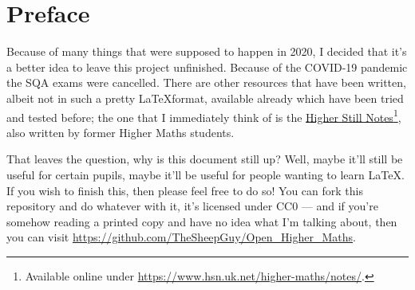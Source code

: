 \chapter{Preface}
Because of many things that were supposed to happen in 2020, I decided that it's a better idea to leave this project unfinished. Because of the COVID-19 pandemic the SQA exams were cancelled. There are other resources that have been written, albeit not in such a pretty \LaTeX format, available already which have been tried and tested before; the one that I immediately think of is the \href{https://www.hsn.uk.net/higher-maths/notes/}{Higher Still Notes}\footnote{Available online under \url{https://www.hsn.uk.net/higher-maths/notes/}.}, also written by former Higher Maths students.

That leaves the question, why is this document still up? Well, maybe it'll still be useful for certain pupils, maybe it'll be useful for people wanting to learn \LaTeX. If you wish to finish this, then please feel free to do so! You can fork this repository and do whatever with it, it's licensed under CC0 --- and if you're somehow reading a printed copy and have no idea what I'm talking about, then you can visit \url{https://github.com/TheSheepGuy/Open_Higher_Maths}.